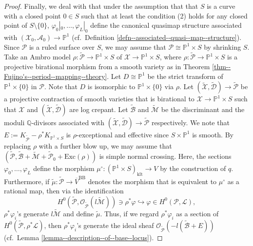 \documentclass[12pt,twoside]{amsart}
\theoremstyle{definition}
\begin{document}
\begin{proof}
Finally, we deal with that under the assumption that that $S$ is a curve with a closed point $0\in S$ such that at least the condition (2) holds for any closed point of $S\setminus\{0\}$, 
$\varphi_0|_0,\ldots,\varphi_L|_0$ define the canonical quasimap structure associated with $(\mathcal{X}_0,\mathcal{A}_0)\to \mathbb{P}^1$ (cf.~Definition \ref{defn--associated--quasi--map--structure}).
Since $\mathcal{P}$ is a ruled surface over $S$, we may assume that $\mathcal{P}\cong\mathbb{P}^1\times S$ by shrinking $S$. 
 Take an Ambro model $\rho\colon\widetilde{\mathcal{P}}\to \mathbb{P}^1\times S$ of $\mathcal{X}\to\mathbb{P}^1\times S$, where $\rho\colon\widetilde{\mathcal{P}}\to \mathbb{P}^1\times S$ is a projective birational morphism from a smooth variety as in Theorem \ref{thm--Fujino's--period--mapping--theory}.
    Let $D\cong\mathbb{P}^1$ be the strict transform of $\mathbb{P}^1\times\{0\}$ in $\mathcal{P}$. 
    Note that $D$ is isomorphic to $\mathbb{P}^1\times\{0\}$ via $\rho$.
    Let $(\widetilde{\mathcal{X}},\widetilde{\mathcal{D}})\to\widetilde{\mathcal{P}}$ be a projective contraction of smooth varieties that is birational to $\mathcal{X}\to \mathbb{P}^1\times S$ such that $\mathcal{X}$ and $(\widetilde{\mathcal{X}},\widetilde{\mathcal{D}})$ are log crepant.
    Let $\widetilde{\mathcal{B}}$ and $\widetilde{\mathcal{M}}$ be the discriminant and the moduli $\mathbb{Q}$-divisors associated with $(\widetilde{\mathcal{X}},\widetilde{\mathcal{D}})\to\widetilde{\mathcal{P}}$ respectively. 
    We note that $E:=K_{\widetilde{\mathcal{P}}}-\rho^*K_{\mathbb{P}^1\times S}$ is $\rho$-exceptional and effective since $S\times \mathbb{P}^1$ is smooth. 
    By replacing $\rho$ with a further blow up, we may assume that $(\widetilde{\mathcal{P}},\widetilde{\mathcal{B}}+\widetilde{\mathcal{M}}+\widetilde{\mathcal{P}}_0 + \mathrm{Exc}(\rho))$ is simple normal crossing.
    Here, the sections $\varphi_0,\ldots,\varphi_L$ define the morphism $\mu^\circ\colon (\mathbb{P}^1\times S)_{\mathrm{klt}}\to V$ by the construction of $q$.
    Furthermore, if $\tilde{\mu}\colon \widetilde{\mathcal{P}}\to \overline{V}^{\mathrm{BB}}$ denotes the morphism that is equivalent to $\mu^\circ$ as a rational map, then via the identification 
    \[ H^0(\tilde{\mathcal{P}},\mathcal{O}_{\widetilde{\mathcal{P}}}(l\widetilde{\mathcal{M}}))\ni\rho^*\varphi\hookrightarrow  \varphi\in H^0(\mathcal{P},\mathscr{L}),
    \]
    $\rho^*\varphi_i$'s generate $l\widetilde{\mathcal{M}}$ and define $\tilde{\mu}$.
    Thus, if we regard $\rho^*\varphi_i$ as a section of $H^0(\widetilde{\mathcal{P}},\rho^*\mathscr{L})$, then $\rho^*\varphi_i$'s generate the ideal sheaf $\mathcal{O}_{\widetilde{\mathcal{P}}}(-l(\widetilde{\mathcal{B}}+E))$ (cf.~Lemma \ref{lemma--description--of--base--locus}).

\end{proof}
\end{document}
